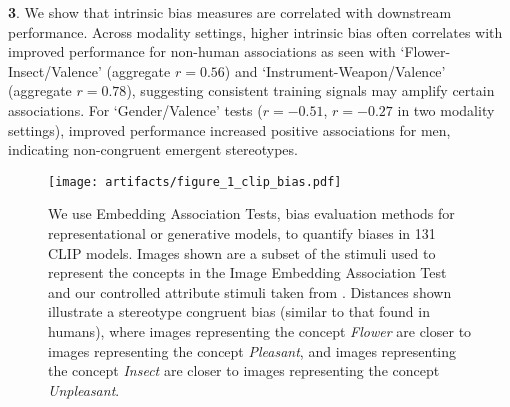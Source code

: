 \textbf{3}. We show that intrinsic bias measures are correlated with downstream performance. Across modality settings, higher intrinsic bias often correlates with improved performance for non-human associations as seen with `Flower-Insect/Valence' (aggregate $r=0.56$) and `Instrument-Weapon/Valence' (aggregate $r=0.78$), suggesting consistent training signals may amplify certain associations. For `Gender/Valence' tests ($r=-0.51$, $r=-0.27$ in two modality settings), improved performance increased positive associations for men, indicating non-congruent emergent stereotypes. 


\begin{figure}
    \centering
    \texttt{[image: artifacts/figure\_1\_clip\_bias.pdf]}
    \caption{We use Embedding Association Tests, bias evaluation methods for representational or generative models, to quantify biases in 131 CLIP models. Images shown are a subset of the stimuli used to represent the concepts in the Image Embedding Association Test \cite{Steed2021} and our controlled attribute stimuli taken from \citet{kurdi2017introducing}. Distances shown illustrate a stereotype congruent bias (similar to that found in humans), where images representing the concept \textit{Flower} are closer to images representing the concept \textit{Pleasant}, and images representing the concept \textit{Insect} are closer to images representing the concept \textit{Unpleasant}.}
    \label{fig:eat-graphic}
\end{figure}





